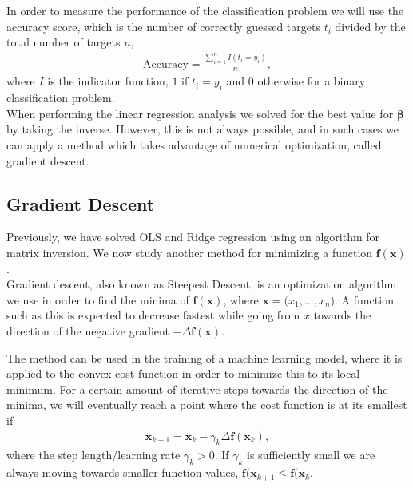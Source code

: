 \documentclass[english,notitlepage,reprint,nofootinbib]{revtex4–2}  %
\begin{document}
In order to measure the performance of the classification problem we will use the accuracy score, which is the number of correctly guessed targets $t_i$ divided by the total number of targets $n$, 
\begin{align}
    \text{Accuracy} = \frac{\sum_{i=1}^n I(t_i = y_i)}{n}, 
\end{align}
where $I$ is the indicator function, $1$ if $t_i = y_i$ and $0$ otherwise for a binary classification problem. 
\vspace{3mm}
\\ 
When performing the linear regression analysis we solved for the best value for $\boldsymbol{\beta}$ by taking the inverse. However, this is not always possible, and in such cases we can apply a method which takes advantage of numerical optimization, called gradient descent. 

\subsection*{Gradient Descent}
Previously, we have solved OLS and Ridge regression using an algorithm for matrix inversion. 
We now study another method for minimizing a function $\boldsymbol{f}(\boldsymbol{x})$. 
\vspace{3mm}
\\ 
Gradient descent, also known as Steepest Descent, is an optimization algorithm we use in order to find the minima of $\boldsymbol{f}(\boldsymbol{x})$, where $\boldsymbol{x} = (x_1, ..., x_n$). A function such as this is expected to decrease fastest while going from $x$ towards the direction of the negative gradient $-\Delta\boldsymbol{f}(\boldsymbol{x})$. 

The method can be used in the training of a machine learning model, where it is applied to the convex cost function in order to minimize this to its local minimum. 
For a certain amount of iterative steps towards the direction of the minima, we will eventually reach a point where the cost function is at its smallest if 
\begin{align}
    \boldsymbol{x}_{k+1} = \boldsymbol{x}_k - \gamma_k \Delta\boldsymbol{f}(\boldsymbol{x}_k), \nonumber 
\end{align}
where the step length/learning rate $\gamma_k > 0$. If $\gamma_k$ is sufficiently small we are always moving towards smaller function values, $\boldsymbol{f}(\boldsymbol{x}_{k+1} \leq \boldsymbol{f}(\boldsymbol{x}_k$. 
\end{document}
